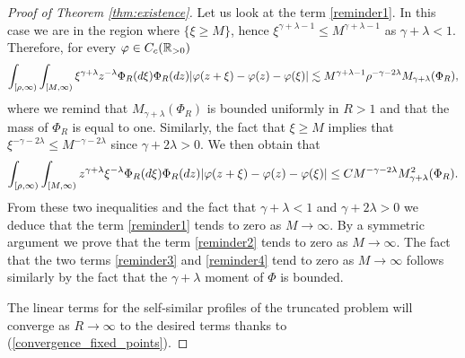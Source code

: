 \documentclass[11pt]{article}
\numberwithin{equation}{section}
\theoremstyle{plain}
\newcommand{\der}{\textup{d}}
\begin{document}
\begin{proof}[Proof of Theorem \ref{thm:existence}]
Let us look at the term \eqref{reminder1}. In this case we are in the region where $\{\xi\geq M\}$, hence $\xi^{\gamma+\lambda-1}\leq M^{\gamma+\lambda-1}$ as $\gamma+\lambda<1$. Therefore, for every $\varphi\in\textup{C}_{c}(\mathbb{R}_{>0})$ 
\begin{align*}
\int_{[\rho,\infty)}\int_{[M,\infty)}\xi^{\gamma+\lambda}z^{-\lambda}\Phi_{R}(\der \xi)\Phi_{R}(\der z)|\varphi(z+\xi)-\varphi(z)-\varphi(\xi)|\lesssim M^{\gamma+\lambda-1}\rho ^{-\gamma-2\lambda} M_{\gamma+\lambda}(\Phi_{R}),
\end{align*}
where we remind that
 $M_{\gamma+\lambda}(\Phi_{R})$ is bounded uniformly in $R>1$ and that the mass of $\Phi_R$ is equal to one. 
 Similarly, the fact that $\xi\geq M$ implies that $\xi^{-\gamma-2\lambda}\leq M^{-\gamma-2\lambda}$ since $\gamma+2\lambda> 0$. 
 We then obtain that
\begin{align*}
\int_{[\rho,\infty)}\int_{[M,\infty)}z^{\gamma+\lambda}\xi^{-\lambda}\Phi_{R}(\der \xi)\Phi_{R}(\der z)|\varphi(z+\xi)-\varphi(z)-\varphi(\xi)|\leq  C M^{-\gamma-2\lambda}M_{\gamma+\lambda}^{2}(\Phi_{R}). 
\end{align*}
From these two inequalities and the fact that $\gamma + \lambda <1 $ and $\gamma + 2 \lambda >0$ we deduce that the term \eqref{reminder1} tends to zero as $M \rightarrow \infty.$
By a symmetric argument we prove that the term \eqref{reminder2} tends to zero as $M\rightarrow\infty$.
The fact that the two terms \eqref{reminder3} and \eqref{reminder4} tend to zero as $M \rightarrow \infty$ follows similarly by the fact that the $\gamma + \lambda $ moment of $\Phi$ is bounded. 

The linear terms for the self-similar profiles of the truncated problem will converge as $R\rightarrow\infty$ to the desired terms thanks to (\ref{convergence_fixed_points}).


\end{proof}
\end{document}
